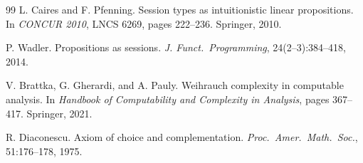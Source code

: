 \documentclass[11pt]{article}
\theoremstyle{definition}
\theoremstyle{plain}
\theoremstyle{remark}
\begin{document}
\begin{thebibliography}{99}
 L. Caires and F. Pfenning. Session types as intuitionistic linear propositions. In
\emph{CONCUR 2010}, LNCS 6269, pages 222--236. Springer, 2010.

 P. Wadler. Propositions as sessions. \emph{J. Funct.\ Programming}, 24(2--3):384--418, 2014.

 V. Brattka, G. Gherardi, and A. Pauly. Weihrauch complexity in computable analysis. In
\emph{Handbook of Computability and Complexity in Analysis}, pages 367--417. Springer, 2021.

 R. Diaconescu. Axiom of choice and complementation. \emph{Proc.\ Amer.\ Math.\ Soc.},
51:176--178, 1975.

\end{thebibliography}
\end{document}
